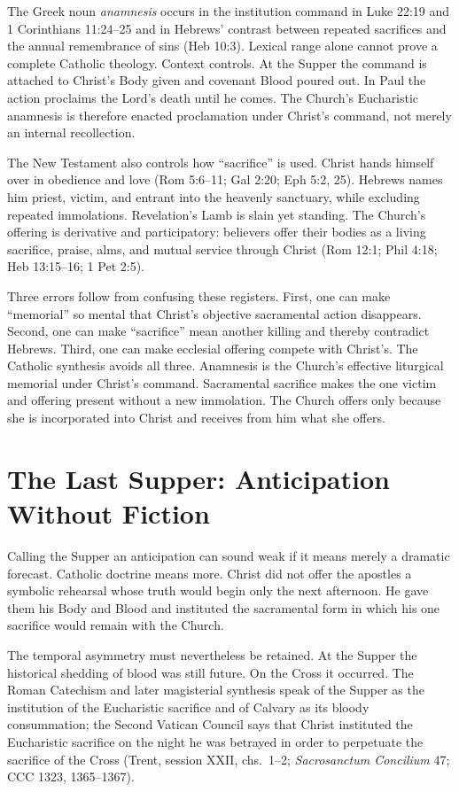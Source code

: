 \begin{deepstudy}
The Greek noun \emph{anamnesis} occurs in the institution command in Luke
22:19 and 1 Corinthians 11:24--25 and in Hebrews' contrast between repeated
sacrifices and the annual remembrance of sins (Heb 10:3). Lexical range alone
cannot prove a complete Catholic theology. Context controls. At the Supper the
command is attached to Christ's Body given and covenant Blood poured out. In
Paul the action proclaims the Lord's death until he comes. The Church's
Eucharistic anamnesis is therefore enacted proclamation under Christ's command,
not merely an internal recollection.

The New Testament also controls how ``sacrifice'' is used. Christ hands himself
over in obedience and love (Rom 5:6--11; Gal 2:20; Eph 5:2, 25). Hebrews names
him priest, victim, and entrant into the heavenly sanctuary, while excluding
repeated immolations. Revelation's Lamb is slain yet standing. The Church's
offering is derivative and participatory: believers offer their bodies as a
living sacrifice, praise, alms, and mutual service through Christ (Rom 12:1;
Phil 4:18; Heb 13:15--16; 1 Pet 2:5).

Three errors follow from confusing these registers. First, one can make
``memorial'' so mental that Christ's objective sacramental action disappears.
Second, one can make ``sacrifice'' mean another killing and thereby contradict
Hebrews. Third, one can make ecclesial offering compete with Christ's. The
Catholic synthesis avoids all three. Anamnesis is the Church's effective
liturgical memorial under Christ's command. Sacramental sacrifice makes the
one victim and offering present without a new immolation. The Church offers
only because she is incorporated into Christ and receives from him what she
offers.

\section{The Last Supper: Anticipation Without Fiction}

Calling the Supper an anticipation can sound weak if it means merely a dramatic
forecast. Catholic doctrine means more. Christ did not offer the apostles a
symbolic rehearsal whose truth would begin only the next afternoon. He gave
them his Body and Blood and instituted the sacramental form in which his one
sacrifice would remain with the Church.

The temporal asymmetry must nevertheless be retained. At the Supper the
historical shedding of blood was still future. On the Cross it occurred. The
Roman Catechism and later magisterial synthesis speak of the Supper as the
institution of the Eucharistic sacrifice and of Calvary as its bloody
consummation; the Second Vatican Council says that Christ instituted the
Eucharistic sacrifice on the night he was betrayed in order to perpetuate the
sacrifice of the Cross (Trent, session XXII, chs.~1--2; \emph{Sacrosanctum
Concilium} 47; CCC 1323, 1365--1367).


\end{deepstudy}
